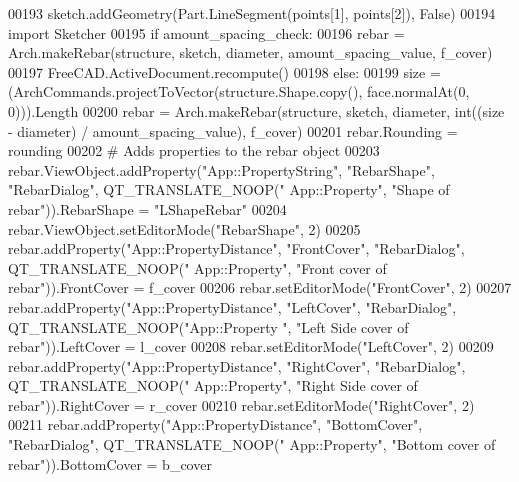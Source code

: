 \begin{DoxyCode}
00193     sketch.addGeometry(Part.LineSegment(points[1], points[2]), \textcolor{keyword}{False})
00194     \textcolor{keyword}{import} Sketcher
00195     \textcolor{keywordflow}{if} amount\_spacing\_check:
00196         rebar = Arch.makeRebar(structure, sketch, diameter, amount\_spacing\_value, f\_cover)
00197         FreeCAD.ActiveDocument.recompute()
00198     \textcolor{keywordflow}{else}:
00199         size = (ArchCommands.projectToVector(structure.Shape.copy(), face.normalAt(0, 0))).Length
00200         rebar = Arch.makeRebar(structure, sketch, diameter, int((size - diameter) / amount\_spacing\_value), 
      f\_cover)
00201     rebar.Rounding = rounding
00202     \textcolor{comment}{# Adds properties to the rebar object}
00203     rebar.ViewObject.addProperty(\textcolor{stringliteral}{"App::PropertyString"}, \textcolor{stringliteral}{"RebarShape"}, \textcolor{stringliteral}{"RebarDialog"}, QT\_TRANSLATE\_NOOP(\textcolor{stringliteral}{"
      App::Property"}, \textcolor{stringliteral}{"Shape of rebar"})).RebarShape = \textcolor{stringliteral}{"LShapeRebar"}
00204     rebar.ViewObject.setEditorMode(\textcolor{stringliteral}{"RebarShape"}, 2)
00205     rebar.addProperty(\textcolor{stringliteral}{"App::PropertyDistance"}, \textcolor{stringliteral}{"FrontCover"}, \textcolor{stringliteral}{"RebarDialog"}, QT\_TRANSLATE\_NOOP(\textcolor{stringliteral}{"
      App::Property"}, \textcolor{stringliteral}{"Front cover of rebar"})).FrontCover = f\_cover
00206     rebar.setEditorMode(\textcolor{stringliteral}{"FrontCover"}, 2)
00207     rebar.addProperty(\textcolor{stringliteral}{"App::PropertyDistance"}, \textcolor{stringliteral}{"LeftCover"}, \textcolor{stringliteral}{"RebarDialog"}, QT\_TRANSLATE\_NOOP(\textcolor{stringliteral}{"App::Property
      "}, \textcolor{stringliteral}{"Left Side cover of rebar"})).LeftCover = l\_cover
00208     rebar.setEditorMode(\textcolor{stringliteral}{"LeftCover"}, 2)
00209     rebar.addProperty(\textcolor{stringliteral}{"App::PropertyDistance"}, \textcolor{stringliteral}{"RightCover"}, \textcolor{stringliteral}{"RebarDialog"}, QT\_TRANSLATE\_NOOP(\textcolor{stringliteral}{"
      App::Property"}, \textcolor{stringliteral}{"Right Side cover of rebar"})).RightCover = r\_cover
00210     rebar.setEditorMode(\textcolor{stringliteral}{"RightCover"}, 2)
00211     rebar.addProperty(\textcolor{stringliteral}{"App::PropertyDistance"}, \textcolor{stringliteral}{"BottomCover"}, \textcolor{stringliteral}{"RebarDialog"}, QT\_TRANSLATE\_NOOP(\textcolor{stringliteral}{"
      App::Property"}, \textcolor{stringliteral}{"Bottom cover of rebar"})).BottomCover = b\_cover

\end{DoxyCode}
